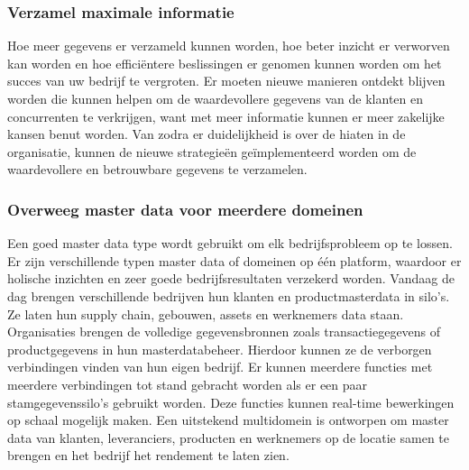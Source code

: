
\subsubsection{Verzamel maximale informatie}
Hoe meer gegevens er verzameld kunnen worden, hoe beter inzicht er verworven kan worden en hoe efficiëntere beslissingen er genomen kunnen worden om het succes van uw bedrijf te vergroten. Er moeten nieuwe manieren ontdekt blijven worden die kunnen helpen om de waardevollere gegevens van de klanten en concurrenten te verkrijgen, want met meer informatie kunnen er meer zakelijke kansen benut worden. Van zodra er duidelijkheid is over de hiaten in de organisatie, kunnen de nieuwe strategieën geïmplementeerd worden om de waardevollere en betrouwbare gegevens te verzamelen.

\subsubsection{Overweeg master data voor meerdere domeinen}
Een goed master data type wordt gebruikt om elk bedrijfsprobleem op te lossen. Er zijn verschillende typen master data of domeinen op één platform, waardoor er holische inzichten en zeer goede bedrijfsresultaten verzekerd worden. Vandaag de dag brengen verschillende bedrijven hun klanten en productmasterdata in silo’s. Ze laten hun supply chain, gebouwen, assets en werknemers data staan. Organisaties brengen de volledige gegevensbronnen zoals transactiegegevens of productgegevens in hun masterdatabeheer. Hierdoor kunnen ze de verborgen verbindingen vinden van hun eigen bedrijf. Er kunnen meerdere functies met meerdere verbindingen tot stand gebracht worden als er een paar stamgegevenssilo’s gebruikt worden. Deze functies kunnen real-time bewerkingen op schaal mogelijk maken. Een uitstekend multidomein is ontworpen om master data van klanten, leveranciers, producten en werknemers op de locatie samen te brengen en het bedrijf het rendement te laten zien. 

